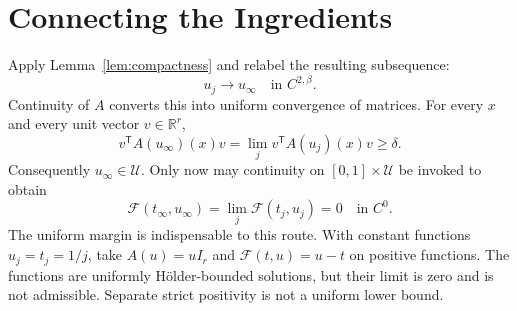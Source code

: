 \documentclass[12pt,reqno]{amsart}
\begin{document}
\section{Connecting the Ingredients}
Apply Lemma~\ref{lem:compactness} and relabel the resulting subsequence:
\[
 u_j\longrightarrow u_\infty\quad\text{in }C^{2,\beta}.
\]
Continuity of $A$ converts this into uniform convergence of matrices.
For every $x$ and every unit vector $v\in\mathbb R^r$,
\[
 v^{\mathsf T}A(u_\infty)(x)v
 =\lim_jv^{\mathsf T}A(u_j)(x)v\geq\delta.
\]
Consequently $u_\infty\in\mathcal U$. Only now may continuity on
$[0,1]\times\mathcal U$ be invoked to obtain
\[
 \mathcal F(t_\infty,u_\infty)
 =\lim_j\mathcal F(t_j,u_j)=0\quad\text{in }C^0.
\]
The uniform margin is indispensable to this route. With constant functions
$u_j=t_j=1/j$, take $A(u)=uI_r$ and $\mathcal F(t,u)=u-t$ on positive functions.
The functions are uniformly H\"older-bounded solutions, but their limit is zero
and is not admissible. Separate strict positivity is not a uniform lower bound.

\nocite{S-guide}


\end{document}
